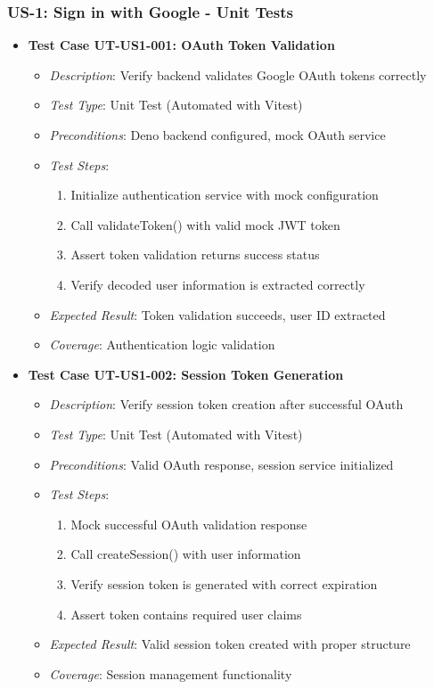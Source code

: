 \documentclass[12pt]{article}
\begin{document}
\subsubsection{US-1: Sign in with Google - Unit Tests}
\begin{itemize}
  \item \textbf{Test Case UT-US1-001: OAuth Token Validation}
    \begin{itemize}
      \item \textit{Description}: Verify backend validates Google OAuth tokens correctly
      \item \textit{Test Type}: Unit Test (Automated with Vitest)
      \item \textit{Preconditions}: Deno backend configured, mock OAuth service
      \item \textit{Test Steps}:
        \begin{enumerate}
          \item Initialize authentication service with mock configuration
          \item Call validateToken() with valid mock JWT token
          \item Assert token validation returns success status
          \item Verify decoded user information is extracted correctly
        \end{enumerate}
      \item \textit{Expected Result}: Token validation succeeds, user ID extracted
      \item \textit{Coverage}: Authentication logic validation
    \end{itemize}

  \item \textbf{Test Case UT-US1-002: Session Token Generation}
    \begin{itemize}
      \item \textit{Description}: Verify session token creation after successful OAuth
      \item \textit{Test Type}: Unit Test (Automated with Vitest)
      \item \textit{Preconditions}: Valid OAuth response, session service initialized
      \item \textit{Test Steps}:
        \begin{enumerate}
          \item Mock successful OAuth validation response
          \item Call createSession() with user information
          \item Verify session token is generated with correct expiration
          \item Assert token contains required user claims
        \end{enumerate}
      \item \textit{Expected Result}: Valid session token created with proper structure
      \item \textit{Coverage}: Session management functionality
    \end{itemize}


\end{itemize}
\end{document}
